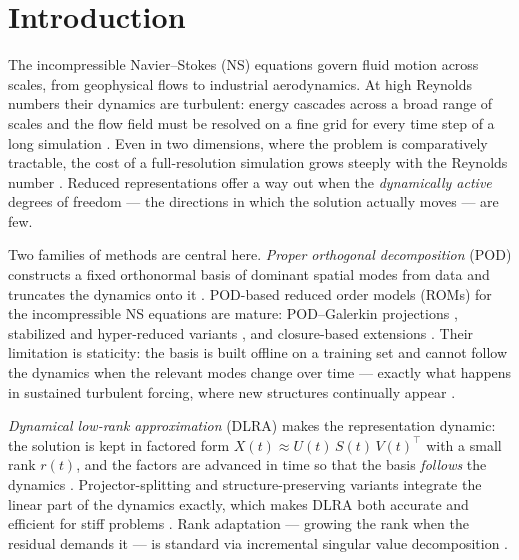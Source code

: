 
\section{Introduction}
\label{sec:intro}

The incompressible Navier--Stokes (NS) equations govern fluid motion across
scales, from geophysical flows to industrial aerodynamics. At high Reynolds
numbers their dynamics are turbulent: energy cascades across a broad range of
scales and the flow field must be resolved on a fine grid for every time step
of a long simulation \cite{batchelor1969,orszag1971}. Even in two
dimensions, where the problem is comparatively tractable, the cost of a
full-resolution simulation grows steeply with the Reynolds number
\cite{vinograd2026}. Reduced representations offer a way out when the
\emph{dynamically active} degrees of freedom --- the directions in which the
solution actually moves --- are few.

Two families of methods are central here. \emph{Proper orthogonal
decomposition} (POD) constructs a fixed orthonormal basis of dominant
spatial modes from data and truncates the dynamics onto it
\cite{sirovich1987,lumley1967}. POD-based reduced order models (ROMs) for the
incompressible NS equations are mature: POD--Galerkin projections
\cite{loorenzi2016,hijazi2020,girfoglio2022pod}, stabilized and
hyper-reduced variants \cite{siena2024,star2021,klein2023}, and
closure-based extensions \cite{prakash2024}. Their limitation is
staticity: the basis is built offline on a training set and cannot follow the
dynamics when the relevant modes change over time --- exactly what happens in
sustained turbulent forcing, where new structures continually appear
\cite{vinograd2026}.

\emph{Dynamical low-rank approximation} (DLRA) makes the representation
dynamic: the solution is kept in factored form $X(t) \approx U(t)\,S(t)\,V(t)^\top$
with a small rank $r(t)$, and the factors are advanced in time so that the
basis \emph{follows} the dynamics \cite{koch2007}. Projector-splitting
and structure-preserving variants integrate the linear part of the dynamics
exactly, which makes DLRA both accurate and efficient for stiff problems
\cite{einkemmer2023,ceruti2024,einkemmer2024review}. Rank adaptation ---
growing the rank when the residual demands it --- is standard via incremental
singular value decomposition \cite{haasdonk2012}.

